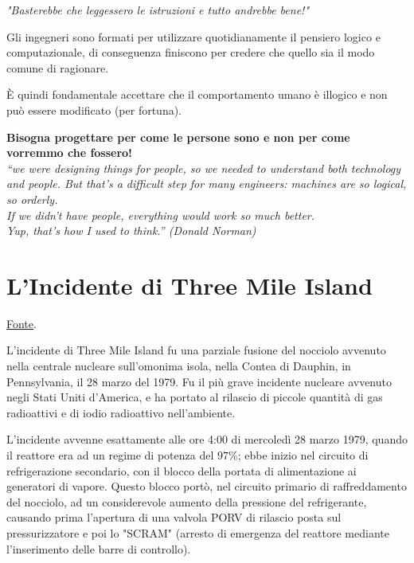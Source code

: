\begin{flushleft}
\textit{"Basterebbe che leggessero le istruzioni e tutto andrebbe bene!"}
\end{flushleft}


Gli ingegneri sono formati per utilizzare quotidianamente il pensiero logico e computazionale, di conseguenza finiscono per credere
che quello sia il modo comune di ragionare. 


È quindi fondamentale accettare che il comportamento umano è illogico e non può essere modificato (per fortuna). 
\begin{flushleft}
\textbf{Bisogna progettare per come le persone sono e non per come vorremmo che fossero!}
\\
\textit{``we were designing things for people, so we needed to understand both technology and people. But that’s a difficult step
for many engineers: machines are so logical, so orderly. \\
If we didn’t have people, everything would work so much better. \\
Yup, that’s how I used to think.” (Donald Norman)}
\end{flushleft}

\section{L'Incidente di Three Mile Island}
\href{https://it.wikipedia.org/wiki/Incidente_di_Three_Mile_Island}{\underline{Fonte}}.
\vspace{\baselineskip}

L'incidente di Three Mile Island fu una parziale fusione del nocciolo avvenuto nella centrale nucleare sull'omonima isola, nella
Contea di Dauphin, in Pennsylvania, il 28 marzo del 1979. Fu il più grave incidente nucleare avvenuto negli Stati Uniti d'America,
e ha portato al rilascio di piccole quantità di gas radioattivi e di iodio radioattivo nell'ambiente.


L'incidente avvenne esattamente alle ore 4:00 di mercoledì 28 marzo 1979, quando il reattore era ad un regime di potenza del $97\%$;
ebbe inizio nel circuito di refrigerazione secondario, con il blocco della portata di alimentazione ai generatori di vapore.
Questo blocco portò, nel circuito primario di raffreddamento del nocciolo, ad un considerevole aumento della pressione del refrigerante,
causando prima l'apertura di una valvola PORV di rilascio posta sul pressurizzatore e poi lo "SCRAM" (arresto di emergenza del reattore
mediante l'inserimento delle barre di controllo). 

